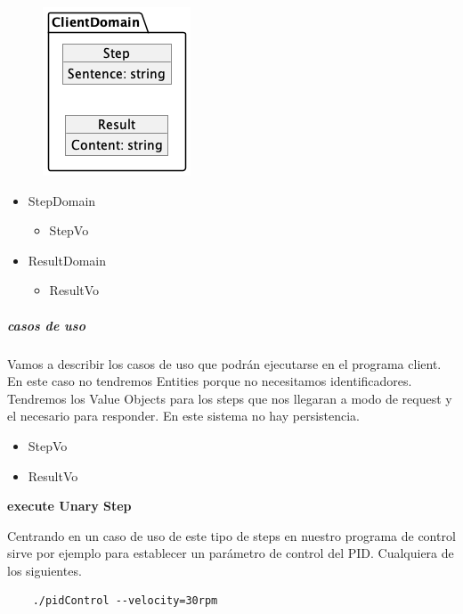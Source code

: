 \begin{figure}[H]
    \centering
    \includegraphics[height=0.4\textheight]{./part/Proyecto_ejecutivo/memoria_descriptiva/descripcionDelProyecto/client/uml/clientDomain}
    \caption[Diagrama de objetos de dominio]{}\label{fig:clientDomain}
\end{figure}

\begin{itemize}
    \item StepDomain
    \begin{itemize}
        \item StepVo
    \end{itemize}
    \item ResultDomain
    \begin{itemize}
        \item ResultVo
    \end{itemize}
\end{itemize}

\subparagraph{casos de uso}

Vamos a describir los casos de uso que podrán ejecutarse en el programa client. En este caso no tendremos Entities porque no necesitamos identificadores.
Tendremos los Value Objects para los steps que nos llegaran a modo de request y el necesario para responder. En este sistema no hay persistencia.

\begin{itemize}
    \item StepVo
    \item ResultVo
\end{itemize}

\textbf{execute Unary Step}

Centrando en un caso de uso de este tipo de steps en nuestro programa de control sirve por ejemplo para establecer un parámetro de control del PID. Cualquiera de los siguientes.
\begin{verbatim}
    ./pidControl --velocity=30rpm
\end{verbatim}


